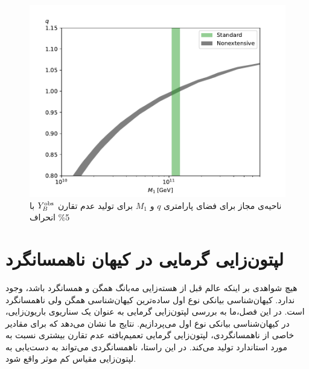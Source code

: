 \documentclass[a4paper]{book}
\begin{document}
\begin{figure}[!h]
	\centering
	\includegraphics[width=13cm]{fig-B-nonextensive.pdf}
	\caption{ناحیه‌ی مجاز برای فضای پارامتری {\footnotesize$q$} و {\footnotesize$M_1$} برای تولید عدم تقارن {\footnotesize$Y^{\rm obs}_{B}$} با 5\% انحراف \label{fig:YB-nonextensive}}
\end{figure}

\chapter{لپتون‌زایی گرمایی در کیهان ناهمسانگرد}
\label{chap:anisotropic}
هیچ شواهدی بر اینکه عالم قبل از هسته‌زایی مه‌بانگ همگن و همسانگرد باشد، وجود ندارد. کیهان‌شناسی بیانکی نوع اول ساده‌ترین کیهان‌شناسی همگن ولی ناهمسانگرد است. در این فصل،‌ما به بررسی لپتون‌زایی گرمایی به عنوان یک سناریوی باریون‌زایی، در کیهان‌شناسی بیانکی نوع اول می‌پردازیم. نتایج ما نشان می‌دهد که برای مقادیر خاصی از ناهمسانگردی، لپتون‌زایی گرمایی تعمیم‌یافته عدم تقارن بیشتری نسبت به مورد استاندارد تولید می‌کند. در این راستا، ناهمسانگردی می‌تواند به دست‌یابی به لپتون‌زایی مقیاس کم موثر واقع شود.
\end{document}

